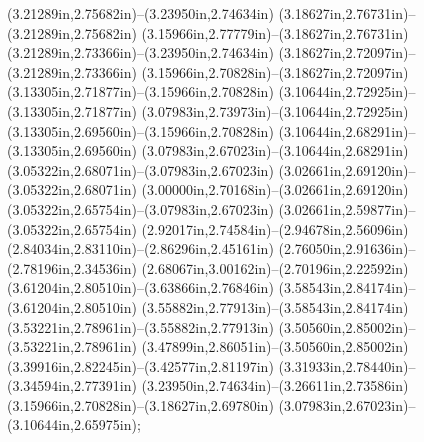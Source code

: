 (3.21289in,2.75682in)--(3.23950in,2.74634in) (3.18627in,2.76731in)--(3.21289in,2.75682in) (3.15966in,2.77779in)--(3.18627in,2.76731in) (3.21289in,2.73366in)--(3.23950in,2.74634in) (3.18627in,2.72097in)--(3.21289in,2.73366in) (3.15966in,2.70828in)--(3.18627in,2.72097in) (3.13305in,2.71877in)--(3.15966in,2.70828in) (3.10644in,2.72925in)--(3.13305in,2.71877in) (3.07983in,2.73973in)--(3.10644in,2.72925in) (3.13305in,2.69560in)--(3.15966in,2.70828in) (3.10644in,2.68291in)--(3.13305in,2.69560in) (3.07983in,2.67023in)--(3.10644in,2.68291in) (3.05322in,2.68071in)--(3.07983in,2.67023in) (3.02661in,2.69120in)--(3.05322in,2.68071in) (3.00000in,2.70168in)--(3.02661in,2.69120in) (3.05322in,2.65754in)--(3.07983in,2.67023in) (3.02661in,2.59877in)--(3.05322in,2.65754in) (2.92017in,2.74584in)--(2.94678in,2.56096in) (2.84034in,2.83110in)--(2.86296in,2.45161in) (2.76050in,2.91636in)--(2.78196in,2.34536in) (2.68067in,3.00162in)--(2.70196in,2.22592in) (3.61204in,2.80510in)--(3.63866in,2.76846in) (3.58543in,2.84174in)--(3.61204in,2.80510in) (3.55882in,2.77913in)--(3.58543in,2.84174in) (3.53221in,2.78961in)--(3.55882in,2.77913in) (3.50560in,2.85002in)--(3.53221in,2.78961in) (3.47899in,2.86051in)--(3.50560in,2.85002in) (3.39916in,2.82245in)--(3.42577in,2.81197in) (3.31933in,2.78440in)--(3.34594in,2.77391in) (3.23950in,2.74634in)--(3.26611in,2.73586in) (3.15966in,2.70828in)--(3.18627in,2.69780in) (3.07983in,2.67023in)--(3.10644in,2.65975in);
